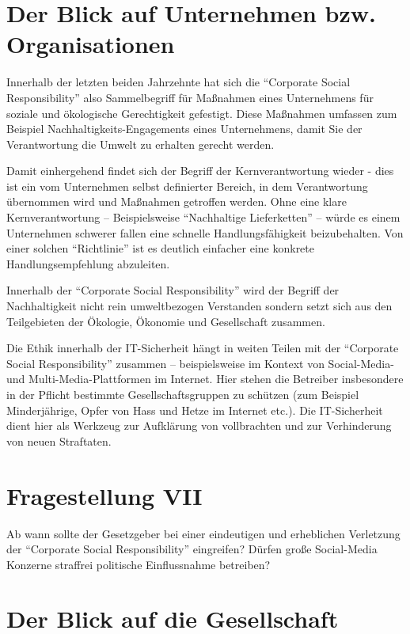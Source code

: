 \documentclass[journal]{IEEEtran}
\begin{document}
\begin{onecolumn}
\newpage

\section{Der Blick auf Unternehmen bzw. Organisationen}

Innerhalb der letzten beiden Jahrzehnte hat sich die ``Corporate Social Responsibility'' also Sammelbegriff
für Maßnahmen eines Unternehmens für soziale und ökologische Gerechtigkeit gefestigt. Diese Maßnahmen
umfassen zum Beispiel Nachhaltigkeits-Engagements eines Unternehmens, damit Sie der Verantwortung die Umwelt
zu erhalten gerecht werden. 

Damit einhergehend findet sich der Begriff der Kernverantwortung wieder - dies ist ein vom Unternehmen
selbst definierter Bereich, in dem Verantwortung übernommen wird und Maßnahmen getroffen werden. Ohne
eine klare Kernverantwortung – Beispielsweise ``Nachhaltige Lieferketten'' – würde es einem Unternehmen
schwerer fallen eine schnelle Handlungsfähigkeit beizubehalten. Von einer solchen ``Richtlinie'' ist es
deutlich einfacher eine konkrete Handlungsempfehlung abzuleiten.

Innerhalb der ``Corporate Social Responsibility'' wird der Begriff der Nachhaltigkeit nicht rein umweltbezogen
Verstanden sondern setzt sich aus den Teilgebieten der Ökologie, Ökonomie und Gesellschaft zusammen. 

Die Ethik innerhalb der IT-Sicherheit hängt in weiten Teilen mit der ``Corporate Social Responsibility''
zusammen – beispielsweise im Kontext von Social-Media- und Multi-Media-Plattformen im Internet. Hier stehen
die Betreiber insbesondere in der Pflicht bestimmte Gesellschaftsgruppen zu schützen (zum Beispiel Minderjährige,
Opfer von Hass und Hetze im Internet etc.). Die IT-Sicherheit dient hier als Werkzeug zur Aufklärung von
vollbrachten und zur Verhinderung von neuen Straftaten.

\section*{Fragestellung VII}

Ab wann sollte der Gesetzgeber bei einer eindeutigen und erheblichen Verletzung der ``Corporate Social
Responsibility'' eingreifen? Dürfen große Social-Media Konzerne straffrei politische Einflussnahme betreiben?

\section{Der Blick auf die Gesellschaft}


\end{onecolumn}
\end{document}
